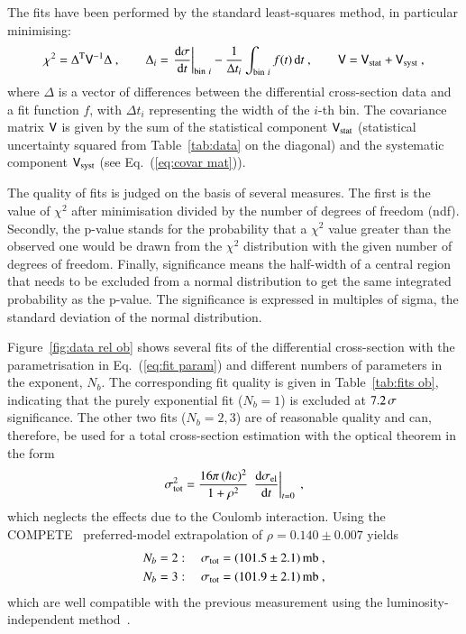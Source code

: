 The fits have been performed by the standard least-squares method, in particular minimising:
\begin{equation}
\label{eq:chi sq}
	\chi^2 = \Delta^{\rm T} \mathsf{V}^{-1} \Delta\ ,\qquad
	\Delta_i = \left.{{\rm d}\sigma\over {\rm d} t}\right|_{{\rm bin}\ i} - {1\over \Delta t_i} \int_{{\rm bin}\ i} f(t)\,{\rm d} t\ ,\qquad
	\mathsf{V} = \mathsf{V}_{\rm stat} + \mathsf{V}_{\rm syst}\ ,
\end{equation}
where $\Delta$ is a vector of differences between the differential cross-section data and a fit function $f$, with $\Delta t_i$ representing the width of the $i$-th bin. The covariance matrix $\mathsf{V}$ is given by the sum of the statistical component $\mathsf{V}_{\rm stat}$ (statistical uncertainty squared from Table~\ref{tab:data} on the diagonal) and the systematic component $\mathsf{V}_{\rm syst}$ (see Eq.~(\ref{eq:covar mat})).

The quality of fits is judged on the basis of several measures. The first is the value of $\chi^2$ after minimisation divided by the number of degrees of freedom (ndf). Secondly, the p-value stands for the probability that a $\chi^2$ value greater than the observed one would be drawn from the $\chi^2$ distribution with the given number of degrees of freedom. Finally, significance means the half-width of a central region that needs to be excluded from a normal distribution to get the same integrated probability as the p-value. The significance is expressed in multiples of sigma, the standard deviation of the normal distribution.

Figure~\ref{fig:data rel ob} shows several fits of the differential cross-section with the parametrisation in Eq.~(\ref{eq:fit param}) and different numbers of parameters in the exponent, $N_b$. The corresponding fit quality is given in Table~\ref{tab:fits ob}, indicating that the purely exponential fit ($N_b = 1$) is excluded at $7.2\,{\rm \sigma}$ significance.
%
The other two fits ($N_b = 2, 3$) are of reasonable quality and can, therefore, be used for a total cross-section estimation with the optical theorem in the form
\begin{equation}
\label{eq:si tot}
\sigma_{\rm tot}^2 = {16\pi\, (\hbar c)^2\over 1 + \rho^2}\, \left. {\rm d}\sigma_{\rm el}\over{\rm d} t\right|_{t=0}\ ,
\end{equation}
which neglects the effects due to the Coulomb interaction.
Using the COMPETE~\cite{compete} preferred-model extrapolation of $\rho = 0.140\pm 0.007$ yields
\begin{equation}
\label{eq:si tot results}
	\begin{aligned}
		N_b &= 2:\quad \sigma_{\rm tot} = (101.5 \pm 2.1)\un{mb}\ ,\\
		N_b &= 3:\quad \sigma_{\rm tot} = (101.9 \pm 2.1)\un{mb}\ ,\\
	\end{aligned}
\end{equation}
which are well compatible with the previous measurement using the luminosity-independent \linebreak method~\cite{prl111}.

